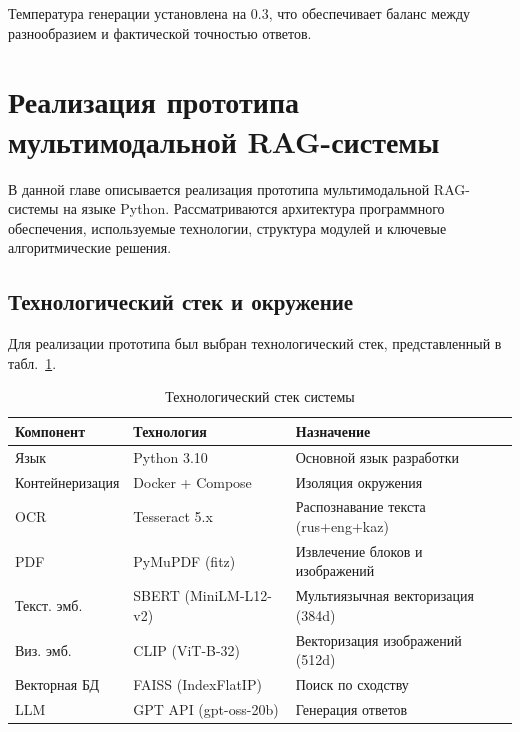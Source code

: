 \documentclass[a4paper,12pt]{article}
\begin{document}
Температура генерации установлена на 0.3, что обеспечивает баланс между разнообразием и фактической точностью ответов.


\newpage

\section{Реализация прототипа мультимодальной RAG-системы}

В данной главе описывается реализация прототипа мультимодальной RAG-системы на языке Python. Рассматриваются архитектура программного обеспечения, используемые технологии, структура модулей и ключевые алгоритмические решения.

\subsection{Технологический стек и окружение}

Для реализации прототипа был выбран технологический стек, представленный в табл.~\ref{tab:tech-stack}.

\begin{table}[H]
    \centering
    \caption{Технологический стек системы}
    \label{tab:tech-stack}
    \begin{tabularx}{\textwidth}{|l|l|X|}
        \hline
        \textbf{Компонент} & \textbf{Технология} & \textbf{Назначение} \\
        \hline
        Язык & Python 3.10 & Основной язык разработки \\
        \hline
        Контейнеризация & Docker + Compose & Изоляция окружения \\
        \hline
        OCR & Tesseract 5.x & Распознавание текста (rus+eng+kaz) \\
        \hline
        PDF & PyMuPDF (fitz) & Извлечение блоков и изображений \\
        \hline
        Текст. эмб. & SBERT (MiniLM-L12-v2) & Мультиязычная векторизация (384d) \\
        \hline
        Виз. эмб. & CLIP (ViT-B-32) & Векторизация изображений (512d) \\
        \hline
        Векторная БД & FAISS (IndexFlatIP) & Поиск по сходству \\
        \hline
        LLM & GPT API (gpt-oss-20b) & Генерация ответов \\
        \hline
    \end{tabularx}
\end{table}
\end{document}

